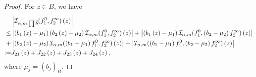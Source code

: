 \documentclass[11pt, twoside, leqno]{article}
\begin{document}
\begin{proof}[Proof]
	For $z \in B$, we have
	\begin{align}\label{eq3.7}
	& \left| {{{\mathcal I}_{\alpha,m,\prod {\vec b} }}(f_1^0,f_2^\infty )\left( z \right)} \right|\notag\\
	\le& \left| {\left( {{b_1}\left( z \right) - {\mu _1}} \right)\left( {{b_2}\left( z \right) - {\mu _2}} \right){\mathcal I}_{\alpha,m}(f_1^0,f_2^\infty )\left( z \right)} \right| + \left| {\left( {{b_1}\left( z \right) - {\mu _1}} \right){\mathcal I}_{\alpha,m}(f_1^0,\left( {{b_2} - {\mu _2}} \right)f_2^\infty )\left( z \right)} \right|\notag\\
	+& \left| {\left( {{b_2}\left( z \right) - {\mu _2}} \right){\mathcal I}_{\alpha,m}(\left( {{b_1} - {\mu _1}} \right)f_1^0,f_2^\infty )\left( z \right)} \right| + \left| {{\mathcal I}_{\alpha,m}(\left( {{b_1} - {\mu _1}} \right)f_1^0,\left( {{b_2} - {\mu _2}} \right)f_2^\infty )\left( z \right)} \right|\notag\\ 
	:=& {J_{21}}\left( z \right) + {J_{22}}\left( z \right) + {J_{23}}\left( z \right) + {J_{24}}\left( z \right),
	\end{align}
	where ${\mu _j} = {\left( {{b_j}} \right)_B}$.
	

\end{proof}
\end{document}
